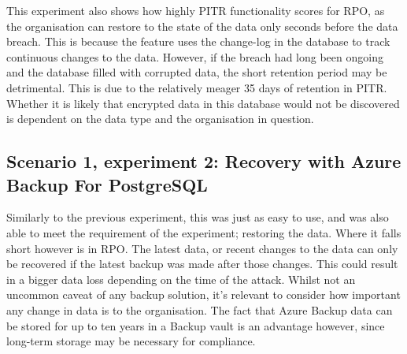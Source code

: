 This experiment also shows how highly PITR functionality scores for RPO, as the organisation can restore to the state of the data only seconds before the data breach. This is because the feature uses the change-log in the database to track continuous changes to the data. However, if the breach had long been ongoing and the database filled with corrupted data, the short retention period may be detrimental. This is due to the relatively meager 35 days of retention in PITR. Whether it is likely that encrypted data in this database would not be discovered is dependent on the data type and the organisation in question.


\subsection{Scenario 1, experiment 2: Recovery with Azure Backup For PostgreSQL}
Similarly to the previous experiment, this was just as easy to use, and was also able to meet the requirement of the experiment; restoring the data. Where it falls short however is in RPO. The latest data, or recent changes to the data can only be recovered if the latest backup was made after those changes.  This could result in a bigger data loss depending on the time of the attack. Whilst not an uncommon caveat of any backup solution, it's relevant to consider how important any change in data is to the organisation. The fact that Azure Backup data can be stored for up to ten years in a Backup vault is an advantage however, since long-term storage may be necessary for compliance. 


